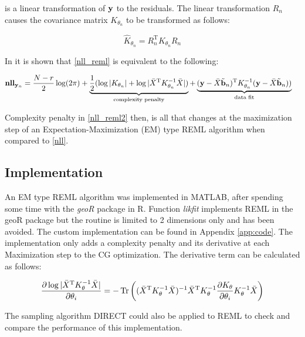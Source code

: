 is a linear transformation of $\mathbf{y}$ to the residuals. The linear transformation $R_{n}$ causes the covariance matrix $K_{\theta_{n}}$ to be transformed as follows:

\begin{equation}
\hat{K}_{\theta_{n}} = R_{n}^{\mathrm{T}}K_{\theta_{n}}R_{n}
\end{equation}

In \cite{reml} it is shown that \eqref{nll_reml} is equivalent to the following:

\begin{align}
\textbf{nll}_{\mathbf{y}_{n}} &= \frac{N-r}{2}\log(2\pi) + \underbrace{\frac{1}{2}(\log|K_{\theta_{n}}| + \log|\bar{X}^{\mathrm{T}}K_{\theta_{n}}^{-1}\bar{X}|)}_{\text{complexity penalty}} + \underbrace{(\mathbf{y} - \bar{X}\tilde{\mathbf{b}}_{n})^{\mathrm{T}}K_{\theta_{n}}^{-1}(\mathbf{y} - \bar{X}\tilde{\mathbf{b}}_{n}))}_{\text{data fit}}
\label{nll_reml2}
\end{align}

Complexity penalty in \eqref{nll_reml2} then, is all that changes at the maximization step of an Expectation-Maximization (EM) type REML algorithm when compared to \eqref{nll}.

\subsection*{Implementation}

An EM type REML algorithm was implemented in MATLAB, after spending some time with the \emph{geoR} package in R.  Function \emph{likfit} implements REML in the geoR package but the routine is limited to 2 dimensions only and has been avoided. The custom implementation can be found in Appendix \ref{app:code}. The implementation only adds a complexity penalty and its derivative at each Maximization step to the CG optimization. The derivative term can be calculated as follows:

\begin{equation}
\frac{\partial \log |\bar{X}^{\mathrm{T}}K_{\theta}^{-1}\bar{X}|}{\partial \theta_{i}} = -\operatorname{Tr} \left((\bar{X}^{\mathrm{T}}K_{\theta}^{-1}\bar{X})^{-1} \bar{X}^{\mathrm{T}} K_{\theta}^{-1}\frac{\partial K_{\theta}}{\partial \theta_{i}}K_{\theta}^{-1}\bar{X} \right) \label{complexityDerivative}
\end{equation}

The sampling algorithm DIRECT could also be applied to REML to check and compare the performance of this implementation.

